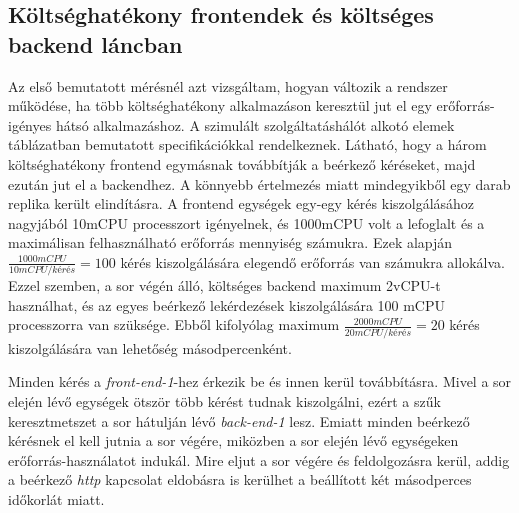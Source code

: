 \subsection{Költséghatékony frontendek és költséges backend láncban}
\label{subsec:3FE_1BE_chain}
Az első bemutatott mérésnél azt vizsgáltam, hogyan változik a rendszer működése, ha több költséghatékony alkalmazáson keresztül jut el egy erőforrás-igényes hátsó alkalmazáshoz.
A szimulált szolgáltatáshálót alkotó elemek  táblázatban bemutatott specifikációkkal rendelkeznek.
Látható, hogy a három költséghatékony frontend egymásnak továbbítják a beérkező kéréseket, majd ezután jut el a backendhez.
A könnyebb értelmezés miatt mindegyikből egy darab replika került elindításra. 
A frontend egységek egy-egy kérés kiszolgálásához nagyjából 10mCPU processzort igényelnek, és 1000mCPU volt a lefoglalt és a maximálisan felhasználható erőforrás mennyiség számukra.
Ezek alapján $\frac{1000 mCPU}{10 mCPU/kérés} = 100$ kérés kiszolgálására elegendő erőforrás van számukra allokálva.
Ezzel szemben, a sor végén álló, költséges backend maximum 2vCPU-t használhat, és az egyes beérkező lekérdezések kiszolgálására 100 mCPU processzorra van szüksége.
Ebből kifolyólag maximum $\frac{2000 mCPU}{20 mCPU/kérés} = 20$ kérés kiszolgálására van lehetőség másodpercenként. 

Minden kérés a \textit{front-end-1}-hez érkezik be és innen kerül továbbításra. 
Mivel a sor elején lévő egységek ötször több kérést tudnak kiszolgálni, ezért a szűk keresztmetszet a sor hátulján lévő \textit{back-end-1} lesz.
Emiatt minden beérkező kérésnek el kell jutnia a sor végére, miközben a sor elején lévő egységeken erőforrás-használatot indukál.
Mire eljut a sor végére és feldolgozásra kerül, addig a beérkező \textit{http} kapcsolat eldobásra is kerülhet a beállított két másodperces időkorlát miatt.

